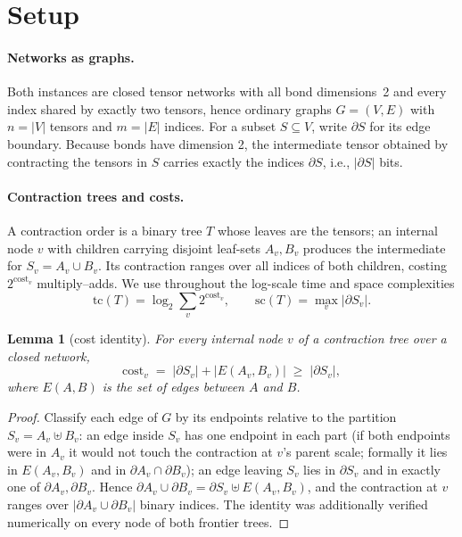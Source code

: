 \documentclass[a4paper,11pt,noarxiv]{quantumarticle}
\newtheorem{lemma}{Lemma}
\newcommand{\tc}{\mathrm{tc}}
\newcommand{\sczz}{\mathrm{sc}}
\newcommand{\bnd}[1]{\partial #1}
\begin{document}
\section{Setup}
\label{sec:setup}

\paragraph{Networks as graphs.} Both instances are closed tensor networks with
all bond dimensions~2 and every index shared by exactly two tensors, hence
ordinary graphs $G=(V,E)$ with $n=|V|$ tensors and $m=|E|$ indices. For a
subset $S\subseteq V$, write $\bnd{S}$ for its edge boundary. Because bonds
have dimension 2, the intermediate tensor obtained by contracting the tensors
in $S$ carries exactly the indices $\bnd{S}$, i.e., $|\bnd{S}|$ bits.

\paragraph{Contraction trees and costs.} A contraction order is a binary tree
$T$ whose leaves are the tensors; an internal node $v$ with children carrying
disjoint leaf-sets $A_v, B_v$ produces the intermediate for
$S_v = A_v\cup B_v$. Its contraction ranges over all indices of both children,
costing $2^{\mathrm{cost}_v}$ multiply--adds. We use throughout the log-scale
time and space complexities
\begin{equation}
\tc(T) = \log_2 \sum_v 2^{\mathrm{cost}_v},
\qquad
\sczz(T) = \max_v |\bnd{S_v}|.
\end{equation}

\begin{lemma}[cost identity]
\label{lem:identity}
For every internal node $v$ of a contraction tree over a closed network,
\begin{equation}
\mathrm{cost}_v \;=\; |\bnd{S_v}| + |E(A_v,B_v)| \;\ge\; |\bnd{S_v}|,
\end{equation}
where $E(A,B)$ is the set of edges between $A$ and $B$.
\end{lemma}

\begin{proof}
Classify each edge of $G$ by its endpoints relative to the partition
$S_v = A_v \uplus B_v$: an edge inside $S_v$ has one endpoint in each part
(if both endpoints were in $A_v$ it would not touch the contraction at $v$'s
parent scale; formally it lies in $E(A_v,B_v)$ and in $\bnd{A_v}\cap\bnd{B_v}$);
an edge leaving $S_v$ lies in $\bnd{S_v}$ and in exactly one of
$\bnd{A_v},\bnd{B_v}$. Hence
$\bnd{A_v}\cup\bnd{B_v} = \bnd{S_v}\uplus E(A_v,B_v)$, and the contraction at
$v$ ranges over $|\bnd{A_v}\cup\bnd{B_v}|$ binary indices. The identity was
additionally verified numerically on every node of both frontier trees.
\end{proof}
\end{document}
